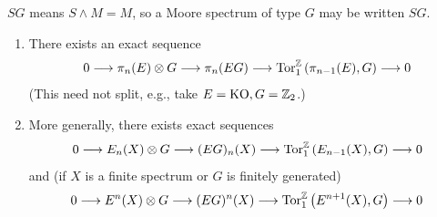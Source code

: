 \documentclass[../main]{subfiles}
\begin{document}
\begin{example}
$SG$ means $S\wedge M = M$, so a Moore spectrum of type $G$ may be written $SG$.
\end{example}

\begin{proposition}\label{prop:p3c06.6}
\begin{enumerate}
    \item There exists an exact sequence
    \[0\longrightarrow \pi_n(E)\otimes G \longrightarrow \pi_n(EG) \longrightarrow \mathrm{Tor}_1^{\mathbb{Z}} \left(\pi_{n-1}(E),G\right) \longrightarrow 0\]
    (This need not split, e.g., take $E=\mathrm{KO}, G=\mathbb{Z}_2$.)
    \item More generally, there exists exact sequences
    \[0\longrightarrow E_n(X)\otimes G \longrightarrow (EG)_n(X)\longrightarrow \mathrm{Tor}_1^{\mathbb{Z}} \left(E_{n-1}(X), G\right) \longrightarrow 0\]
    and (if $X$ is a finite spectrum or $G$ is finitely generated)
    \[0\longrightarrow E^n(X)\otimes G \longrightarrow (EG)^n(X)\longrightarrow \mathrm{Tor}_1^{\mathbb{Z}} \left(E^{n+1}(X), G\right) \longrightarrow 0\]
\end{enumerate}
\end{proposition}
\end{document}
